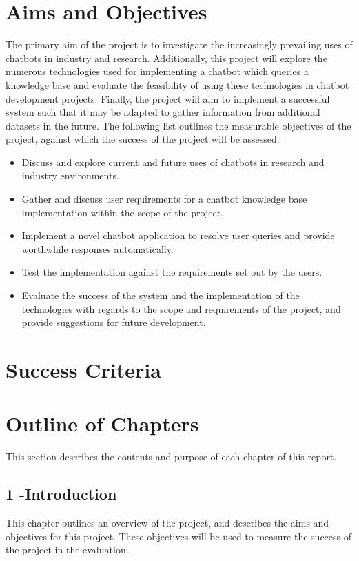 \section{Aims and Objectives}
\label{sec:aims}
The primary aim of the project is to investigate the increasingly prevailing uses of chatbots in industry and research. Additionally, this project will explore the numerous technologies used for implementing a chatbot which queries a knowledge base and evaluate the feasibility of using these technologies in chatbot development projects. Finally, the project will aim to implement a successful system such that it may be adapted to gather information from additional datasets in the future. The following list outlines the measurable objectives of the project, against which the success of the project will be assessed.

\begin{itemize}
	\itemsep0em 
	\item Discuss and explore current and future uses of chatbots in research and industry environments.
	\item Gather and discuss user requirements for a chatbot knowledge base implementation within the scope of the project.
	\item Implement a novel chatbot application to resolve user queries and provide worthwhile responses automatically.
	\item Test the implementation against the requirements set out by the users.
	\item Evaluate the success of the system and the implementation of the technologies with regards to the scope and requirements of the project, and provide suggestions for future development.

\end{itemize}

\section{Success Criteria}

\newpage
\section{Outline of Chapters}
This section describes the contents and purpose of each chapter of this report.

\subsection*{1 -Introduction}
This chapter outlines an overview of the project, and describes the aims and objectives for this project. These objectives will be used to measure the success of the project in the evaluation.

